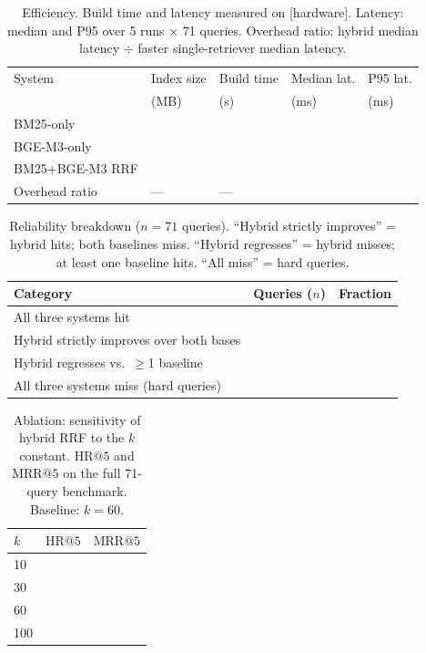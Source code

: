 \documentclass{iosart2x}
\makeatletter
\newcommand{\HR}[1]{\text{HR}@{#1}}
\newcommand{\MRR}[1]{\text{MRR}@{#1}}
\newcommand{\PH}{\text{[PLACEHOLDER]}\xspace}
\newcommand{\bgem}{BGE-M3\xspace}
\newcommand{\rrf}{RRF\xspace}
\makeatother
\begin{document}
\begin{table}[t]
\caption{Efficiency.  Build time and latency measured on [hardware].
  Latency: median and P95 over 5 runs $\times$ 71 queries.
  Overhead ratio: hybrid median latency $\div$ faster single-retriever
  median latency.}
\label{tab:efficiency}
\centering
\small
\begin{tabular}{@{}lllll@{}}
\toprule
System & Index size & Build time & Median lat. & P95 lat. \\
       & (MB)       & (s)        & (ms)        & (ms)     \\
\midrule
BM25-only          & \PH & \PH & \PH & \PH \\
\bgem-only         & \PH & \PH & \PH & \PH \\
BM25+\bgem{} RRF   & \PH & \PH & \PH & \PH \\
\midrule
Overhead ratio     & --- & --- & \PH & \PH \\
\bottomrule
\end{tabular}
\end{table}

\begin{table}[t]
\caption{Reliability breakdown ($n{=}71$ queries).
  ``Hybrid strictly improves'' = hybrid hits; both baselines miss.
  ``Hybrid regresses'' = hybrid misses; at least one baseline hits.
  ``All miss'' = hard queries.}
\label{tab:reliability}
\centering
\small
\begin{tabular}{@{}lll@{}}
\toprule
Category & Queries ($n$) & Fraction \\
\midrule
All three systems hit                      & \PH & \PH \\
Hybrid strictly improves over both bases   & \PH & \PH \\
Hybrid regresses vs.\ $\geq$1 baseline    & \PH & \PH \\
All three systems miss (hard queries)      & \PH & \PH \\
\bottomrule
\end{tabular}
\end{table}

\begin{table}[t]
\caption{Ablation: sensitivity of hybrid \rrf to the $k$ constant.
  $\HR{5}$ and $\MRR{5}$ on the full 71-query benchmark.
  Baseline: $k{=}60$.}
\label{tab:ablation}
\centering
\small
\begin{tabular}{@{}lll@{}}
\toprule
$k$   & $\HR{5}$ & $\MRR{5}$ \\
\midrule
10  & \PH & \PH \\
30  & \PH & \PH \\
60  & \PH & \PH \\
100 & \PH & \PH \\
\bottomrule
\end{tabular}
\end{table}
\end{document}
